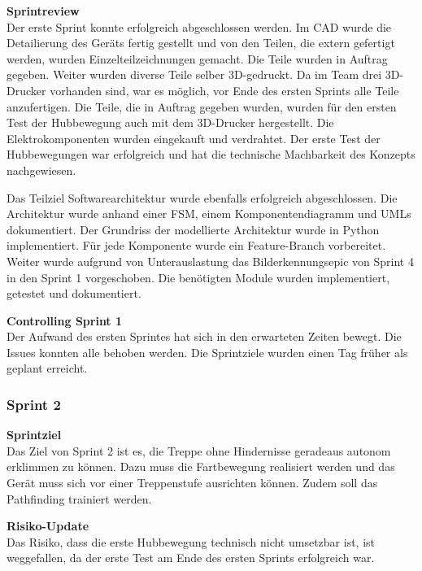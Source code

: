 \newpage

\textbf{Sprintreview}\\
Der erste Sprint konnte erfolgreich abgeschlossen werden. Im CAD wurde die Detailierung des Geräts fertig gestellt und von den Teilen, die extern gefertigt werden, wurden Einzelteilzeichnungen gemacht. Die Teile wurden in Auftrag gegeben. Weiter wurden diverse Teile selber 3D-gedruckt. Da im Team drei 3D-Drucker vorhanden sind, war es möglich, vor Ende des ersten Sprints alle Teile anzufertigen. Die Teile, die in Auftrag gegeben wurden, wurden für den ersten Test der Hubbewegung auch mit dem 3D-Drucker hergestellt.
Die Elektrokomponenten wurden eingekauft und verdrahtet.
Der erste Test der Hubbewegungen war erfolgreich und hat die technische Machbarkeit des Konzepts nachgewiesen.

Das Teilziel Softwarearchitektur wurde ebenfalls erfolgreich abgeschlossen. Die Architektur wurde anhand einer FSM, einem Komponentendiagramm und UMLs dokumentiert. Der Grundriss der modellierte Architektur wurde in Python implementiert. Für jede Komponente wurde ein Feature-Branch vorbereitet. 
Weiter wurde aufgrund von Unterauslastung das Bilderkennungsepic von Sprint 4 in den Sprint 1 vorgeschoben. Die benötigten Module wurden implementiert, getestet und dokumentiert.

\textbf{Controlling Sprint 1}\\
Der Aufwand des ersten Sprintes hat sich in den erwarteten Zeiten bewegt. Die Issues konnten alle behoben werden. Die Sprintziele wurden einen Tag früher als geplant erreicht.

\subsubsection{Sprint 2}
\textbf{Sprintziel}\\
Das Ziel von Sprint 2 ist es, die Treppe ohne Hindernisse geradeaus autonom erklimmen zu können. Dazu muss die Fartbewegung realisiert werden und das Gerät muss sich vor einer Treppenstufe ausrichten können. Zudem soll das Pathfinding trainiert werden.

\textbf{Risiko-Update}\\
Das Risiko, dass die erste Hubbewegung technisch nicht umsetzbar ist, ist weggefallen, da der erste Test am Ende des ersten Sprints erfolgreich war.

